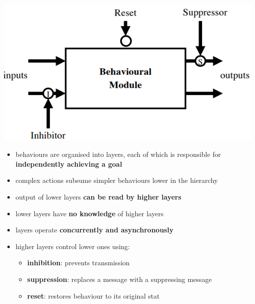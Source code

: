 \documentclass{article}
\begin{document}
\begin{center}
\begin{minipage}{0.48\linewidth}
  \includegraphics[scale=0.5]{behaviour_model.png}
\end{minipage}%
\end{center}

\begin{itemize}
  \item behaviours are organised into layers, each of which is responsible for \textbf{independently achieving a goal}
  \item complex actions subsume simpler behaviours lower in the hierarchy 
  \item output of lower layers \textbf{can be read by higher layers }
  \item lower layers have \textbf{no knowledge} of higher layers 
  \item layers operate \textbf{concurrently and asynchronously}
  \item higher layers control lower ones using:
  \begin{itemize}
    \item \textbf{inhibition}: prevents transmission 
    \item \textbf{suppression}: replaces a message with a suppressing message
    \item \textbf{reset}: restores behaviour to its original stat
  \end{itemize}
\end{itemize}
\end{document}
